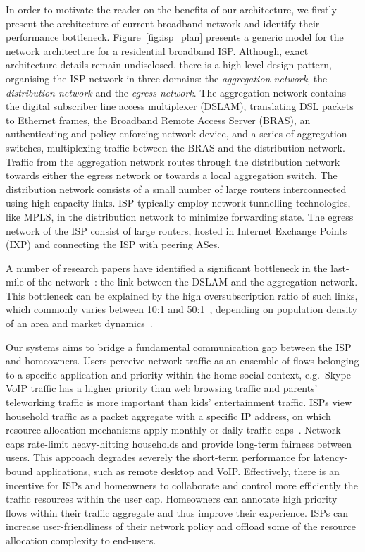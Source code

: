 In order to motivate the reader on the benefits of our architecture, we firstly
present the architecture of current broadband network and identify their
performance bottleneck. Figure~\ref{fig:isp_plan} presents a generic model for
the network architecture for a residential broadband ISP\@. Although, exact
architecture details remain undisclosed, there is a high level design pattern,
organising the ISP network in three domains: the \textit{aggregation network},
the \textit{distribution network} and the \textit{egress network}. The
aggregation network contains the digital subscriber line access multiplexer
(DSLAM), translating DSL packets to Ethernet frames, the Broadband Remote Access
Server (BRAS), an authenticating and policy enforcing network device, and a
series of aggregation switches, multiplexing traffic between the BRAS and the
distribution network.  Traffic from the aggregation network routes through the
distribution network towards either the egress network or towards a local
aggregation switch. The distribution network consists of a small number of large
routers interconnected using high capacity links.  ISP typically employ network
tunnelling technologies, like MPLS, in the distribution network to
minimize forwarding state.  The egress network of the ISP consist of large
routers, hosted in Internet Exchange Points (IXP) and connecting the ISP with
peering ASes.

A number of research papers have identified a significant bottleneck in the
last-mile of the network~: the link between
the DSLAM and the aggregation network. This bottleneck can be explained by the
high oversubscription ratio of such links, which commonly varies between 10:1
and 50:1~, depending on population density of an area
and market dynamics~.  

Our systems aims to bridge a fundamental communication gap between the ISP and
homeowners. Users perceive network traffic as an ensemble of flows belonging to
a specific application and priority within the home social context,
e.g.~Skype VoIP traffic has a higher priority than web browsing traffic and
parents' teleworking traffic is more important than kids' entertainment traffic.
ISPs view household traffic as a packet aggregate with a specific IP address, on
which resource allocation mechanisms apply monthly or daily traffic
caps~.  Network caps rate-limit heavy-hitting
households and provide long-term fairness between users. This approach degrades
severely the short-term performance for latency-bound applications, such as
remote desktop and VoIP\@. Effectively, there is an incentive for ISPs and
homeowners to collaborate and control more efficiently the traffic resources
within the user cap.  Homeowners can annotate high priority flows within their
traffic aggregate and thus improve their experience. ISPs can increase
user-friendliness of their network policy and offload some of the resource
allocation complexity to end-users. 


